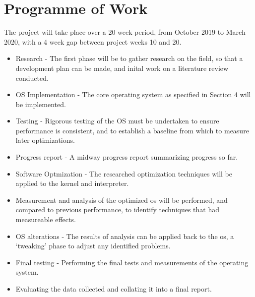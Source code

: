 \documentclass{article}
\begin{document}
  \section{Programme of Work}
  The project will take place over a 20 week period, from October 2019 to March 2020, with a 4 week gap between project weeks 10 and 20.
  \begin{itemize}
  \item Research - The first phase will be to gather research on the field, so that a development plan can be made, and inital work on a literature review conducted.
  \item OS Implementation - The core operating system as specified in Section 4 will be implemented.
  \item Testing - Rigorous testing of the OS must be undertaken to ensure performance is consistent, and to establish a baseline from which to measure later optimizations. 
  \item Progress report - A midway progress report summarizing progress so far.
  \item Software Optmization - The researched optimization techniques will be applied to the kernel and interpreter.
  \item Measurement and analysis of the optimized os will be performed, and compared to previous performance, to identify techniques that had measureable effects.
  \item OS alterations - The results of analysis can be applied back to the os, a `tweaking' phase to adjust any identified problems.
  \item Final testing - Performing the final tests and measurements of the operating system.
  \item Evaluating the data collected and collating it into a final report.
  \end{itemize}
  
\end{document}
